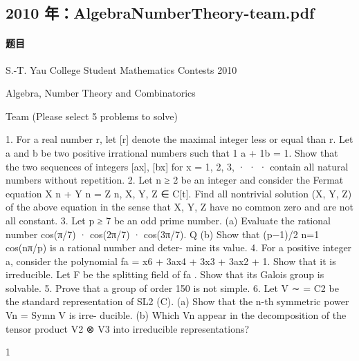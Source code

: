 \documentclass[UTF8,12pt]{ctexart}
\begin{document}
\subsection{2010 年：AlgebraNumberTheory-team.pdf}
\paragraph{题目}
S.-T. Yau College Student Mathematics Contests 2010

Algebra, Number Theory and Combinatorics

Team (Please select 5 problems to solve)

1. For a real number r, let [r] denote the maximal integer less or equal than r. Let a and b be two positive irrational numbers such that 1 a + 1b = 1. Show that the two sequences of integers [ax], [bx] for x = 1, 2, 3, · · · contain all natural numbers without repetition. 2. Let n ≥ 2 be an integer and consider the Fermat equation X n + Y n = Z n, X, Y, Z ∈ C[t]. Find all nontrivial solution (X, Y, Z) of the above equation in the sense that X, Y, Z have no common zero and are not all constant. 3. Let p ≥ 7 be an odd prime number. (a) Evaluate the rational number cos(π/7) · cos(2π/7) · cos(3π/7). Q (b) Show that (p−1)/2 n=1 cos(nπ/p) is a rational number and deter- mine its value. 4. For a positive integer a, consider the polynomial fa = x6 + 3ax4 + 3x3 + 3ax2 + 1. Show that it is irreducible. Let F be the splitting field of fa . Show that its Galois group is solvable. 5. Prove that a group of order 150 is not simple. 6. Let V ∼ = C2 be the standard representation of SL2 (C). (a) Show that the n-th symmetric power Vn = Symn V is irre- ducible. (b) Which Vn appear in the decomposition of the tensor product V2 ⊗ V3 into irreducible representations?

1
\end{document}
